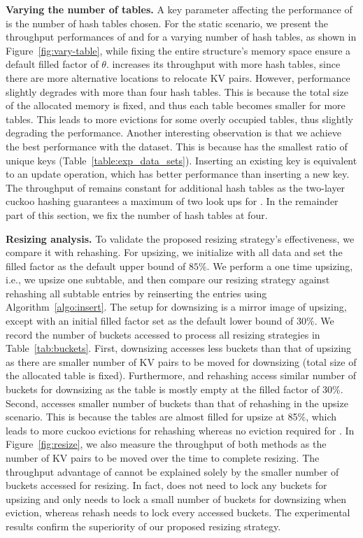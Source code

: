 \vspace{1mm}
\noindent\textbf{Varying the number of tables.}
A key parameter affecting the performance of \voter is the number of hash tables chosen. For the static scenario, we present the throughput performances of  and  for a varying number of hash tables, as shown in Figure~\ref{fig:vary-table}, while fixing the entire structure's memory space ensure a default filled factor of $\theta$. 
 increases its throughput with more hash tables, since there are more alternative locations to relocate KV pairs. 
However, performance slightly degrades with more than four hash tables. This is because the total size of the allocated memory is fixed,
and thus each table becomes smaller for more tables. This leads to more evictions for some overly occupied tables, thus slightly degrading the performance.
Another interesting observation is that we achieve the best performance with the \dsali dataset. This is because \dsali has the smallest ratio of unique keys (Table~\ref{table:exp_data_sets}). Inserting an existing key is equivalent to an update operation, which has better performance than inserting a new key.
The throughput of  remains constant for additional hash tables as the two-layer cuckoo hashing guarantees a maximum of two look ups for . In the remainder part of this section, we fix the number of hash tables at four.

\vspace{1mm}
\noindent\textbf{Resizing analysis.}
To validate the proposed resizing strategy's effectiveness, we compare it with rehashing. 
For upsizing, we initialize \voter with all data and set the filled factor as the default upper bound of $85\%$. We perform a one time upsizing, i.e., we upsize one subtable, and then compare our resizing strategy against rehashing all subtable entries by reinserting the entries using Algorithm~\ref{algo:insert}.
The setup for downsizing is a mirror image of upsizing, except with an initial filled factor set as the default lower bound of $30\%$. 
We record the number of buckets accessed to process all resizing strategies in Table~\ref{tab:buckets}. First, downsizing accesses less buckets than that of upsizing as there are smaller number of KV pairs to be moved for downsizing (total size of the allocated table is fixed). Furthermore, \voter and rehashing access similar number of buckets for downsizing as the table is mostly empty at the filled factor of 30\%. Second, \voter accesses smaller number of buckets than that of rehashing in the upsize scenario. This is because the tables are almost filled for upsize at 85\%, which leads to more cuckoo evictions for rehashing whereas no eviction required for \voter. In Figure~\ref{fig:resize}, we also measure the throughput of both methods as the number of KV pairs to be moved over the time to complete resizing. The throughput advantage of \voter cannot be explained solely by the smaller number of buckets accessed for resizing. In fact, \voter does not need to lock any buckets for upsizing and only needs to lock a small number of buckets for downsizing when eviction, whereas rehash needs to lock every accessed buckets. The experimental results confirm the superiority of our proposed resizing strategy.


